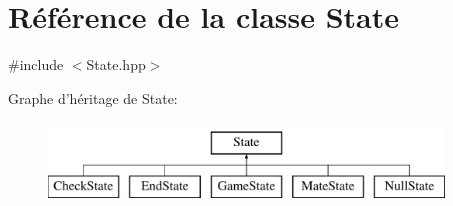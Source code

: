 \hypertarget{class_state}{\section{Référence de la classe State}
\label{class_state}
}


{\ttfamily \#include $<$State.\-hpp$>$}

Graphe d'héritage de State\-:\begin{figure}[H]
\begin{center}
\leavevmode
\includegraphics[height=2.000000cm]{class_state}
\end{center}
\end{figure}

